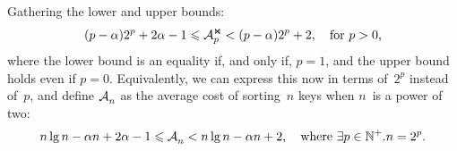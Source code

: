 \documentclass[a4paper,11pt,twoside,final]{book}
\theoremstyle{plain}
\begin{document}
Gathering the lower and upper bounds:
\begin{equation*}
(p - \alpha)2^p + 2\alpha - 1 \leqslant \mathcal{A}_{p}^{\Join} < (p-\alpha)2^p + 2, \quad
  \text{for \(p > 0\),}
\end{equation*}
where the lower bound is an equality if, and only if, \(p = 1\), and the upper
bound holds even if \(p = 0\). Equivalently, we can express this now in terms
of~\(2^p\) instead of~\(p\), and define \(\mathcal{A}_{n}^{}\) as the average cost of
sorting~\(n\) keys when \(n\)~is a power of two:
\begin{equation}
  n \lg n - \alpha n + 2\alpha - 1 \leqslant \mathcal{A}_{n}^{} < n \lg n - \alpha n + 2,
  \quad \text{where \(\exists p \in \mathbb{N}^+.n=2^p\).}
  \label{ineq:M_join}
\end{equation}
\end{document}
